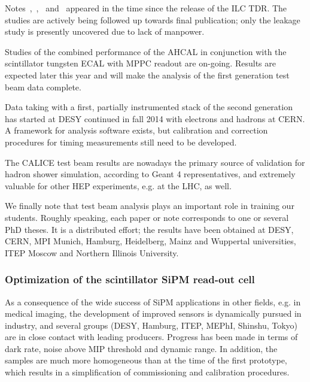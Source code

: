 Notes~\cite{Calice:CAN044},~\cite{Calice:CAN048},~\cite{Calice:CAN049} and~\cite{Calice:CAN051} appeared in the time since the release of the ILC TDR. The studies are actively being followed up towards final publication; only the leakage study is presently uncovered due to lack of manpower.

Studies of the combined performance of the AHCAL in conjunction with the scintillator tungsten ECAL with MPPC readout are on-going. Results are expected later this year and will make the analysis of the first generation test beam data complete.

Data taking with a first, partially instrumented stack of the second generation has started at DESY continued in fall 2014 with electrons and hadrons at CERN. A framework for analysis software exists, but calibration and correction procedures for timing measurements still need to be developed.

The CALICE test beam results are nowadays the primary source of validation for hadron shower simulation, according to Geant 4 representatives, and extremely valuable for other HEP experiments, e.g. at the LHC, as well.

We finally note that test beam analysis plays an important role in training our students. Roughly speaking, each paper or note corresponds to one or several PhD theses. It is a distributed effort; the results have been obtained at DESY, CERN, MPI Munich, Hamburg, Heidelberg, Mainz and Wuppertal universities, ITEP Moscow and Northern Illinois University.


\subsubsection{Optimization of the scintillator SiPM read-out cell}
\label{sec:OptimizationSiPMRO}

As a consequence of the wide success of SiPM applications in other fields, e.g. in medical imaging, the development of improved sensors is dynamically pursued in industry, and several groups (DESY, Hamburg, ITEP, MEPhI, Shinshu, Tokyo) are in close contact with leading producers. Progress has been made in terms of dark rate, noise above MIP threshold and dynamic range. In addition, the samples are much more homogeneous than at the time of the first prototype, which results in a simplification of commissioning and calibration procedures.

